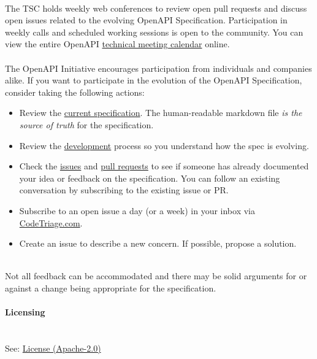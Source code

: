 \documentclass{article}
\begin{document}
\\
The TSC holds weekly web conferences to review open pull requests and discuss open issues related to the evolving OpenAPI Specification. Participation in weekly calls and scheduled working sessions is open to the community. You can view the entire OpenAPI \href{https://calendar.google.com/calendar/u/0/embed?src=c_fue82vsncog6ahhjvuokjo8qsk@group.calendar.google.com}{technical meeting calendar} online.\\
\\
The OpenAPI Initiative encourages participation from individuals and companies alike. If you want to participate in the evolution of the OpenAPI Specification, consider taking the following actions:\\
\begin{itemize}
	\item Review the \href{versions/3.1.0.md}{current specification}. The human-readable markdown file \textit{is the source of truth} for the specification.
	\item Review the \href{DEVELOPMENT.md}{development} process so you understand how the spec is evolving.
	\item Check the \href{https://github.com/OAI/OpenAPI-Specification/issues}{issues} and \href{https://github.com/OAI/OpenAPI-Specification/pulls}{pull requests} to see if someone has already documented your idea or feedback on the specification. You can follow an existing conversation by subscribing to the existing issue or PR.
	\item Subscribe to an open issue a day (or a week) in your inbox via \href{https://www.codetriage.com/oai/openapi-specification}{CodeTriage.com}.
	\item Create an issue to describe a new concern. If possible, propose a solution.
\end{itemize}
\\
Not all feedback can be accommodated and there may be solid arguments for or against a change being appropriate for the specification.\\
\\
{\noindent \LARGE \textbf{Licensing}}\\\\
\\
See: \href{https://github.com/OAI/OpenAPI-Specification/blob/main/LICENSE}{License (Apache-2.0)}\\
\end{document}

